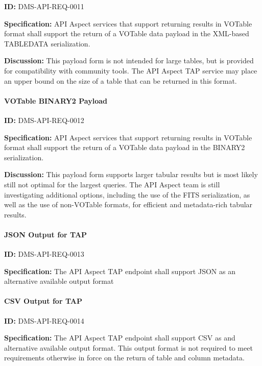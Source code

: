 \documentclass[SE,toc]{lsstdoc}
\begin{document}
\label{DMS-API-REQ-0011}
\textbf{ID:} DMS-API-REQ-0011

\textbf{Specification:}
API Aspect services that support returning results in VOTable format shall support the return of a VOTable data payload in the XML-based TABLEDATA serialization.

\textbf{Discussion:}
This payload form is not intended for large tables, but is provided for compatibility with community tools.  The API Aspect TAP service may place an upper bound on the size of a table that can be returned in this format.

\paragraph{VOTable BINARY2 Payload}\hfill  %

\label{DMS-API-REQ-0012}
\textbf{ID:} DMS-API-REQ-0012

\textbf{Specification:}
API Aspect services that support returning results in VOTable format shall support the return of a VOTable data payload in the BINARY2 serialization.

\textbf{Discussion:}
This payload form supports larger tabular results but is most likely still not optimal for the largest queries.  The API Aspect team is still investigating additional options, including the use of the FITS serialization, as well as the use of non-VOTable formats, for efficient and metadata-rich tabular results.

\paragraph{JSON Output for TAP}\hfill  %

\label{DMS-API-REQ-0013}
\textbf{ID:} DMS-API-REQ-0013

\textbf{Specification:}
The API Aspect TAP endpoint shall support JSON as an alternative available output format

\paragraph{CSV Output for TAP}\hfill  %

\label{DMS-API-REQ-0014}
\textbf{ID:} DMS-API-REQ-0014

\textbf{Specification:}
The API Aspect TAP endpoint shall support CSV as and alternative available output format.  This output format is not required to meet requirements otherwise in force on the return of table and column metadata.
\end{document}
